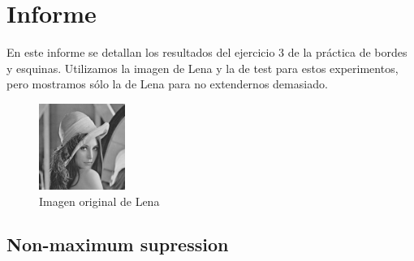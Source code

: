 \documentclass[a4paper]{article}
\begin{document}
\section*{Informe}

En este informe se detallan los resultados del ejercicio 3 de la práctica de bordes y esquinas. Utilizamos la imagen de Lena y la de test para estos experimentos, pero mostramos sólo la de Lena para no extendernos demasiado.

\begin{figure}[H]
\centering
\includegraphics[width=0.25\textwidth]{imagenesInforme/lena}
\caption{Imagen original de Lena}
\end{figure}

\subsection*{Non-maximum supression}
\end{document}
